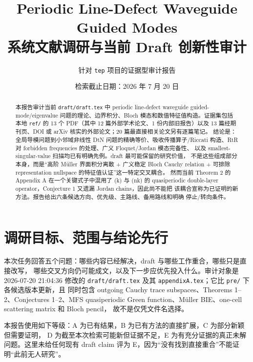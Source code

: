 \documentclass[UTF8,11pt,fontset=none]{ctexart}
\title{\bfseries Periodic Line-Defect Waveguide Guided Modes\\
系统文献调研与当前 Draft 创新性审计}
\author{针对 \texttt{tep} 项目的证据型审计报告}
\date{检索截止日期：2026 年 7 月 20 日}
\newcommand{\draft}{\texttt{draft/}\allowbreak\texttt{draft.tex}}
\begin{document}
\maketitle

\begin{abstract}
本报告审计当前 \draft{} 中 periodic line-defect waveguide guided-mode/eigenvalue
问题的理论、边界积分、Bloch 模态和数值特征值构造。证据集包括本地
\texttt{ref/} 的 13 个 PDF（其中 12 篇外部学术论文、1 份内部旧报告）以及
13 篇经期刊页、DOI 或 arXiv 核实的外部论文；20 篇最直接相关论文另有逐篇笔记。
结论是：全局导模问题到小邻域非线性 DtN 问题的精确等价、吸收传播算子/Riccati
构造、RtR 对 forbidden frequencies 的处理、广义 Floquet/Jordan 模态完备性、
以及 smallest-singular-value 扫描均已有明确先例。draft 最可能保留的研究价值，
不是这些组成部分本身，而是“高阶 Müller 界面积分离散 + 广义稳定 Bloch Cauchy
relation + 可排除 representation nullspace 的特征值认证”这一特定交叉耦合。
然而当前 Theorem 2 的 Appendix A 在一个关键式子中混用了 (k) 与 (nk) 的
quasiperiodic double-layer operator，Conjecture 1 又遗漏 Jordan chains，因此尚不能把
该耦合宣称为已证明的新方法。报告给出六条候选方向、优先级、主路线、备用路线和明确
停止/转向条件。
\end{abstract}

\tableofcontents
\clearpage

\section{调研目标、范围与结论先行}

本次任务回答五个问题：哪些内容已经解决，draft 与哪些工作重合，哪些只是直接改写，
哪些交叉方向仍可能成文，以及下一步应优先投入什么。审计对象是 2026-07-20 21:04:36
修改的 \draft{} 及其 \texttt{appendixA.tex}；它比 \texttt{pre/} 下各候选版本更新，且
同时包含 outgoing Cauchy trace subspaces、Theorems 1--2、Conjectures 1--2、MFS
quasiperiodic Green function、Müller BIE、one-cell scattering matrix 和 Bloch pencil，
故不是仅凭文件名选择。

本报告使用如下等级：A 为已有结果，B 为已有方法的直接扩展，C 为部分新颖但需要证明，
D 为截至本次检索可能新但证据不足，E 为有充分证据的真正未解问题。这里未给任何现有
draft claim 评为 E，因为“没有找到直接重合”不能证明“此前无人研究”。
\end{document}
